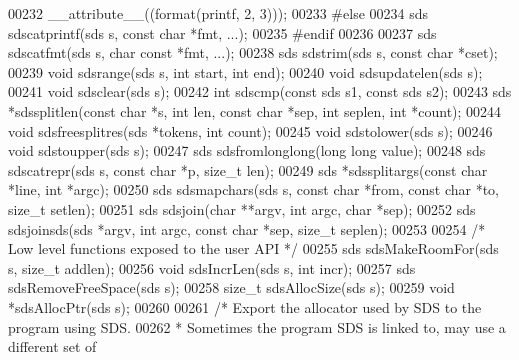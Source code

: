 \begin{DoxyCode}
00232     \textcolor{keyword}{\_\_attribute\_\_}((format(printf, 2, 3)));
00233 \textcolor{preprocessor}{#}\textcolor{preprocessor}{else}
00234 sds sdscatprintf(sds s, \textcolor{keyword}{const} \textcolor{keywordtype}{char} *fmt, ...);
00235 \textcolor{preprocessor}{#}\textcolor{preprocessor}{endif}
00236 
00237 sds sdscatfmt(sds s, \textcolor{keywordtype}{char} \textcolor{keyword}{const} *fmt, ...);
00238 sds sdstrim(sds s, \textcolor{keyword}{const} \textcolor{keywordtype}{char} *cset);
00239 \textcolor{keywordtype}{void} sdsrange(sds s, \textcolor{keywordtype}{int} start, \textcolor{keywordtype}{int} end);
00240 \textcolor{keywordtype}{void} sdsupdatelen(sds s);
00241 \textcolor{keywordtype}{void} sdsclear(sds s);
00242 \textcolor{keywordtype}{int} sdscmp(\textcolor{keyword}{const} sds s1, \textcolor{keyword}{const} sds s2);
00243 sds *sdssplitlen(\textcolor{keyword}{const} \textcolor{keywordtype}{char} *s, \textcolor{keywordtype}{int} len, \textcolor{keyword}{const} \textcolor{keywordtype}{char} *sep, \textcolor{keywordtype}{int} seplen, \textcolor{keywordtype}{int} *count);
00244 \textcolor{keywordtype}{void} sdsfreesplitres(sds *tokens, \textcolor{keywordtype}{int} count);
00245 \textcolor{keywordtype}{void} sdstolower(sds s);
00246 \textcolor{keywordtype}{void} sdstoupper(sds s);
00247 sds sdsfromlonglong(\textcolor{keywordtype}{long} \textcolor{keywordtype}{long} value);
00248 sds sdscatrepr(sds s, \textcolor{keyword}{const} \textcolor{keywordtype}{char} *p, size\_t len);
00249 sds *sdssplitargs(\textcolor{keyword}{const} \textcolor{keywordtype}{char} *line, \textcolor{keywordtype}{int} *argc);
00250 sds sdsmapchars(sds s, \textcolor{keyword}{const} \textcolor{keywordtype}{char} *from, \textcolor{keyword}{const} \textcolor{keywordtype}{char} *to, size\_t setlen);
00251 sds sdsjoin(\textcolor{keywordtype}{char} **argv, \textcolor{keywordtype}{int} argc, \textcolor{keywordtype}{char} *sep);
00252 sds sdsjoinsds(sds *argv, \textcolor{keywordtype}{int} argc, \textcolor{keyword}{const} \textcolor{keywordtype}{char} *sep, size\_t seplen);
00253 
00254 \textcolor{comment}{/* Low level functions exposed to the user API */}
00255 sds sdsMakeRoomFor(sds s, size\_t addlen);
00256 \textcolor{keywordtype}{void} sdsIncrLen(sds s, \textcolor{keywordtype}{int} incr);
00257 sds sdsRemoveFreeSpace(sds s);
00258 size\_t sdsAllocSize(sds s);
00259 \textcolor{keywordtype}{void} *sdsAllocPtr(sds s);
00260 
00261 \textcolor{comment}{/* Export the allocator used by SDS to the program using SDS.}
00262 \textcolor{comment}{ * Sometimes the program SDS is linked to, may use a different set of}

\end{DoxyCode}
